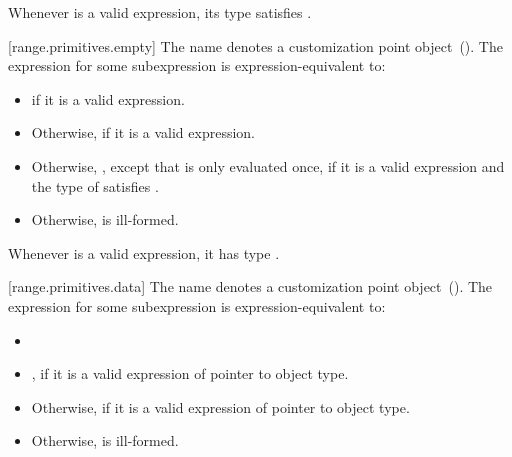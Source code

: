 \pnum
\enternote Whenever  is a valid expression, its
type satisfies . \exitnote

[range.primitives.empty]{}
\pnum
The name  denotes a customization point
object~(). The expression
 for some subexpression  is
expression-equivalent to:

\begin{itemize}
\item
   if it is a valid expression.

\item
  Otherwise,  if it is a valid expression.

\item
  Otherwise, ,
  except that  is only evaluated once, if it is a valid expression and the type of
   satisfies .

\item
  Otherwise,  is ill-formed.
\end{itemize}

\pnum
\enternote Whenever  is a valid expression, it
has type . \exitnote

[range.primitives.data]{}
\pnum
The name  denotes a customization point
object~(). The expression
 for some subexpression  is
expression-equivalent to:

\begin{itemize}
\item

\item
  ,
   if it is a valid expression of pointer
  to object type.

\item
  Otherwise,  if it is a valid expression of pointer to
  object type.

\item
  Otherwise,  is ill-formed.
\end{itemize}


